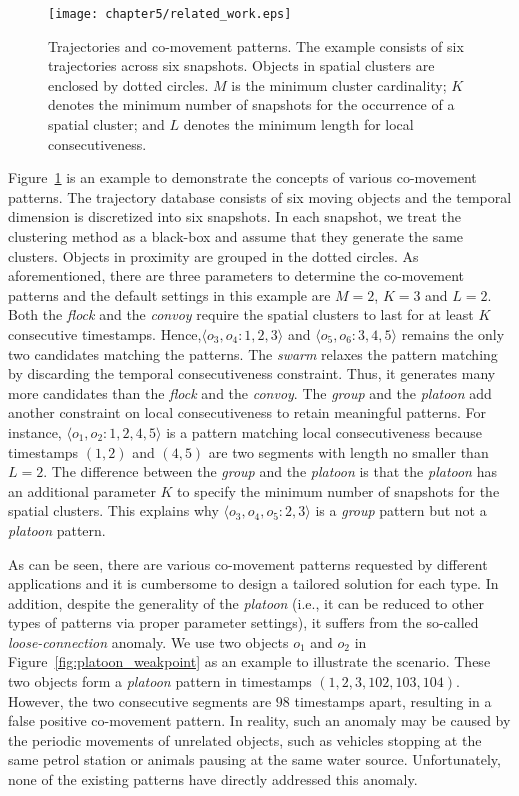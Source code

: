 \begin{figure}[h]
\centering
\texttt{[image: chapter5/related\_work.eps]}
\caption{Trajectories and co-movement patterns. The example consists of six trajectories across six snapshots. Objects in spatial clusters are enclosed by dotted circles. $M$ is the minimum cluster cardinality; $K$ denotes the minimum number of snapshots for the occurrence of a spatial cluster; and $L$ denotes the minimum length for local consecutiveness.}
\label{fig:related_work}
\end{figure}

Figure~\ref{fig:related_work} is an example to demonstrate the concepts of various co-movement patterns. The trajectory database consists of six moving objects and the temporal dimension is discretized into six snapshots. In each snapshot, we treat the clustering method as a black-box and assume that they generate the same clusters. Objects in proximity are grouped in the dotted circles. As aforementioned, there are three parameters to determine the co-movement patterns and the default settings in this example are $M=2$, $K=3$ and $L=2$. Both the \emph{flock} and the \emph{convoy} require the spatial clusters to last for at least $K$ consecutive  timestamps. Hence,$\langle o_3,o_4:1,2,3 \rangle$ and $\langle o_5,o_6:3,4,5 \rangle$  remains the only two candidates matching the patterns. The \textit{swarm} relaxes the pattern matching by discarding the temporal consecutiveness constraint. Thus, it generates many more candidates than the \textit{flock} and the \textit{convoy}. The \textit{group} and the \textit{platoon} add another constraint on local consecutiveness to retain meaningful patterns. For instance, $\langle o_1,o_2:1,2,4,5 \rangle$ is a pattern matching local consecutiveness because timestamps $(1,2)$ and $(4,5)$ are two segments with length no smaller than $L=2$. The difference between the \textit{group} and the \textit{platoon} is that the \textit{platoon} has an additional parameter $K$ to specify the minimum number of snapshots for the spatial clusters. This explains why $\langle o_3,o_4,o_5:2,3 \rangle$ is a  \textit{group} pattern but not a \textit{platoon} pattern.

As can be seen, there are various co-movement patterns requested by different applications and it is cumbersome to design a tailored solution for each type. In addition, despite the generality of the \emph{platoon} (i.e., it can be reduced to other types of patterns via proper parameter settings), it suffers from the so-called \emph{loose-connection} anomaly. We use two objects $o_1$ and $o_2$ in Figure~\ref{fig:platoon_weakpoint} as an example to illustrate the scenario. These two objects form a \emph{platoon} pattern in timestamps $(1,2,3,102,103,104)$. However, the two consecutive segments are $98$ timestamps apart, resulting in a false positive co-movement pattern. In reality, such an anomaly may be caused  by the periodic movements of unrelated objects, such as vehicles stopping at the same petrol station or animals pausing at the same water source. 
Unfortunately, none of the existing patterns have directly addressed this anomaly.

